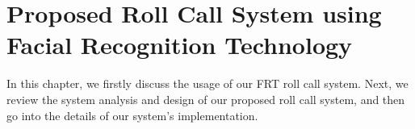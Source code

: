 \chapter{Proposed Roll Call System using Facial Recognition Technology}
In this chapter, we firstly discuss the usage of our FRT roll call system. Next,
we review the system analysis and design of our proposed roll call system, and then
go into the details of our system's implementation.




